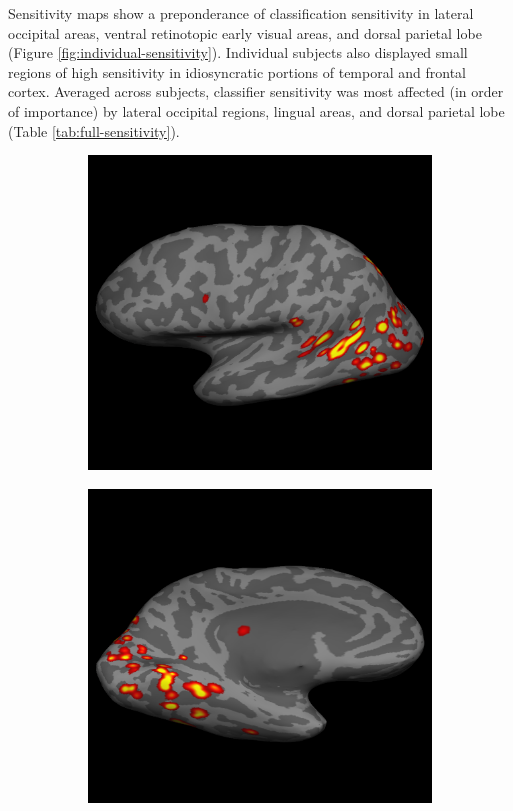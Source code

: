 \documentclass[preprint,5p,authoryear]{elsarticle}
\begin{document}
Sensitivity maps show a preponderance of classification sensitivity in
lateral occipital areas, ventral retinotopic early visual areas, and dorsal parietal lobe (Figure \ref{fig:individual-sensitivity}). 
Individual subjects also displayed small regions of high sensitivity in idiosyncratic portions of temporal and frontal cortex. 
Averaged across subjects, classifier sensitivity was most affected (in order of importance) by lateral occipital regions, lingual areas, and dorsal parietal lobe (Table \ref{tab:full-sensitivity}). 

\begin{figure}[p]
\centering
\begin{subfigure}{0.3\textwidth}
\centering
\includegraphics[width=\textwidth]{figures/s1-lh-lateral-sensitivity}
\caption{}
\label{fig:s1-lh-lateral-sensitivity}
\end{subfigure}
\begin{subfigure}{0.3\textwidth}
\centering
\includegraphics[width=\textwidth]{figures/s1-lh-medial-sensitivity}

\end{subfigure}
\end{figure}
\end{document}
